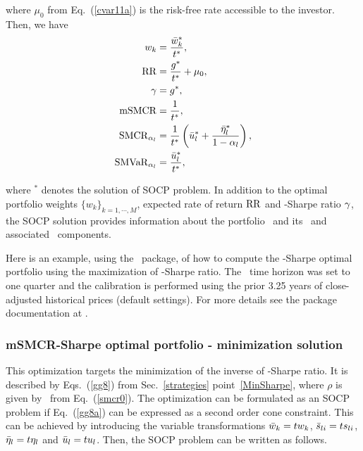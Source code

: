 \noindent where $\mu_0$ from Eq.~(\ref{cvar11a}) is the risk-free rate accessible to the investor.
Then, we have
\begin{subequations}\label{smcr10}
\begin{align}
    w_k &= \frac{\bw_k^*}{t^*}, \label{smcr10a} \\
    \RR &= \frac{g^*}{t^*}  + \mu_0, \label{smcr10c} \\
    \Sharpe &= g^*, \label{smcr10b} \\
    \mSMCR &= \frac{1}{t^*}, \label{smcr10d} \\
    \SMCR_{\alpha_l} &= \frac{1}{t^*}\left( \bu_l^* + \frac{\bbeta_l^*}{1-\alpha_l}  \right), \label{smcr10e} \\
    \SMVaR_{\alpha_l} &= \frac{\bu_l^*}{t^*} , \label{smcr10f}
\end{align}
\end{subequations}

\noindent where $^*$ denotes the solution of SOCP problem.
In addition to the optimal portfolio weights $\{w_k\}_{k=1,\cdots,M}$, expected rate of return ${\rm RR}$ and \mSMCR-Sharpe ratio ${\gamma}$,
the SOCP solution provides information about the portfolio \mSMCR\ and its \SMCR\  and associated \SMVaR\ components.

\bigskip
\noindent Here is an example, using the \azapy\ package, of how to compute the \mSMCR-Sharpe optimal portfolio using the maximization
of \mSMCR-Sharpe ratio.
The \mSMCR\ time horizon was set to one quarter and the calibration is performed using the prior 3.25 years of
close-adjusted historical prices (default settings).
For more details see the package documentation at \azapydoc.



\BackToContents

\subsubsection{mSMCR-Sharpe optimal portfolio - minimization solution}
This optimization targets the minimization of the inverse of \mSMCR-Sharpe ratio.
It is described by Eqs.~(\ref{gg8}) from Sec.~\ref{strategies} point~\ref{MinSharpe}, where
$\rho$ is given by \mSMCR\ from Eq.~(\ref{smcr0}).
The optimization can be formulated as an SOCP problem if Eq.~(\ref{gg8a}) can be expressed as a second order cone constraint. This can be achieved by
introducing the variable transformations
${\bar w}_k = t w_k$, ${\bar s}_{li} = t s_{li}$, ${\bar \eta}_l = t \eta_l$ and ${\bar u}_l = t u_l$.
Then, the SOCP problem can be written as follows.

